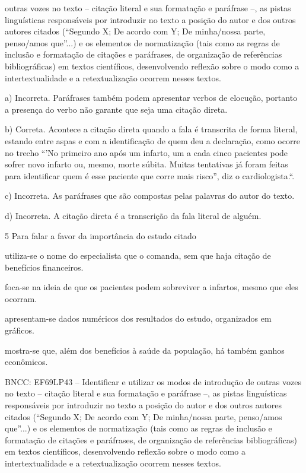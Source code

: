 outras vozes no texto -- citação literal e sua formatação e paráfrase
--, as pistas linguísticas responsáveis por introduzir no texto a
posição do autor e dos outros autores citados (``Segundo X; De acordo
com Y; De minha/nossa parte, penso/amos que''...) e os elementos de
normatização (tais como as regras de inclusão e formatação de citações e
paráfrases, de organização de referências bibliográficas) em textos
científicos, desenvolvendo reflexão sobre o modo como a
intertextualidade e a retextualização ocorrem nesses textos.

a) Incorreta. Paráfrases também podem apresentar verbos de elocução,
portanto a presença do verbo não garante que seja uma citação direta.

b) Correta. Acontece a citação direta quando a fala é transcrita de
forma literal, estando entre aspas e com a identificação de quem deu a
declaração, como ocorre no trecho ``'No primeiro ano após um infarto, um
a cada cinco pacientes pode sofrer novo infarto ou, mesmo, morte súbita.
Muitas tentativas já foram feitas para identificar quem é esse paciente
que corre mais risco'', diz o cardiologista.``.

c) Incorreta. As paráfrases que são compostas pelas palavras do autor do
texto.

d) Incorreta. A citação direta é a transcrição da fala literal de
alguém.

\num {5} Para falar a favor da importância do estudo citado

\begin{escolha}
\item utiliza-se o nome do especialista que o comanda, sem que haja
citação de benefícios financeiros.

\item foca-se na ideia de que os pacientes podem sobreviver a infartos,
mesmo que eles ocorram.

\item apresentam-se dados numéricos dos resultados do estudo, organizados
em gráficos.

\item mostra-se que, além dos benefícios à saúde da população, há também
ganhos econômicos.
\end{escolha}

BNCC: EF69LP43 -- Identificar e utilizar os modos de introdução de
outras vozes no texto -- citação literal e sua formatação e paráfrase
--, as pistas linguísticas responsáveis por introduzir no texto a
posição do autor e dos outros autores citados (``Segundo X; De acordo
com Y; De minha/nossa parte, penso/amos que''...) e os elementos de
normatização (tais como as regras de inclusão e formatação de citações e
paráfrases, de organização de referências bibliográficas) em textos
científicos, desenvolvendo reflexão sobre o modo como a
intertextualidade e a retextualização ocorrem nesses textos.

